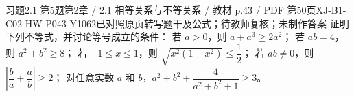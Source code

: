 \par\noindent\begin{minipage}{\linewidth}
\begin{bankitem}{习题2.1 第5题}{第2章 / 2.1 相等关系与不等关系 / 教材 p.43 / PDF 第50页}{XJ-B1-C02-HW-P043-Y1062}{已对照原页转写题干及公式；待教师复核；未制作答案}
证明下列不等式，并讨论等号成立的条件：
若 $a>0$，则 $a+a^3\ge2a^2$；
若 $ab=4$，则 $a^2+b^2\ge8$；
若 $-1\le x\le1$，则 $\sqrt{x^2(1-x^2)}\le\dfrac12$；
若 $ab\ne0$，则 $\left|\dfrac ba+\dfrac ab\right|\ge2$；
对任意实数 $a$ 和 $b$，$a^2+b^2+\dfrac4{a^2+b^2+1}\ge3$。
\end{bankitem}
\end{minipage}\par\medskip
